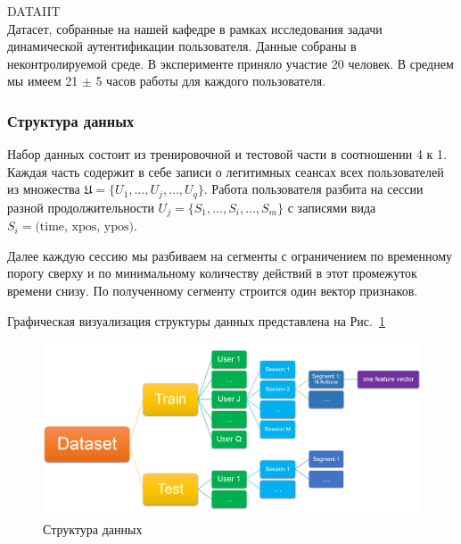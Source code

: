 \documentclass[12pt]{article}
\begin{document}
    \noindent\textsc{DATAIIT} \\
    \noident Датасет, собранные на нашей кафедре в рамках исследования задачи динамической аутентификации пользователя. Данные собраны в неконтролируемой среде. В эксперименте приняло участие 20 человек. В среднем мы имеем 21 $\pm$ 5 часов работы для каждого пользователя. \\


    \subsubsection{Структура данных}
    \label{sec:Research:Data:Struct}
    
    \par Набор данных состоит из тренировочной и тестовой части в соотношении 4 к 1. Каждая часть содержит в себе записи о легитимных сеансах всех пользователей из множества $\mathfrak{U}=\{U_1, \ldots, U_j, \ldots, U_q\}$. Работа пользователя разбита на сессии разной продолжительности $U_j = \{S_1, \ldots, S_i, \ldots, S_m\}$ с записями вида $S_i = \text{(time, xpos, ypos)}$. \\
    \par Далее каждую сессию мы разбиваем на сегменты с ограничением по временному порогу сверху и по минимальному количеству действий в этот промежуток времени снизу. По полученному сегменту строится один вектор признаков. \\
    \par Графическая визуализация структуры данных представлена на Рис.~\ref{sec:Research:Data:Description:fig:DataStructure}

    \begin{figure}[h]
        \centering
        \includegraphics[width=\linewidth]{DataStructure.png}
        \caption{Структура данных}
        \label{sec:Research:Data:Description:fig:DataStructure}
    \end{figure}
\end{document}
